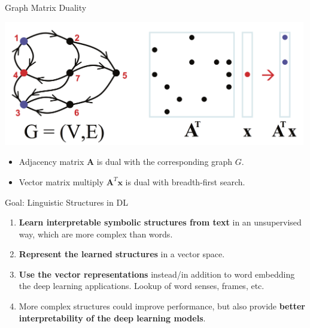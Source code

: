 \begin{frame}{Graph Matrix Duality}
	\vspace{-25pt}
	
  \begin{center}
  	\includegraphics[width=0.99\textwidth]{figures/graph2matrix}
  \end{center}
  
  \pause 

  \begin{itemize}
  	\item   Adjacency matrix $\mathbf{A}$ is dual with the corresponding graph $G$.
  	\pause 
  	\item Vector matrix multiply $\mathbf{A}^T\mathbf{x}$ is dual with breadth-first search.
  \end{itemize}
% 
%
\end{frame}


\begin{frame}{Goal: Linguistic Structures in DL}

  \begin{enumerate}
  	\item \textbf{Learn interpretable symbolic structures from text} in an unsupervised way, which are \alert{more complex than words}.
  	\pause 
  	\item \textbf{Represent the learned structures} in a vector space.
  	\pause 
  	\item \textbf{Use the vector representations} instead/in addition to word embedding the deep learning applications. \alert{Lookup of word senses, frames, etc.}
  	\pause 
  	\item More complex structures could improve performance, but also provide \textbf{better interpretability of the deep learning models}. 
  	
  \end{enumerate}

\end{frame}
